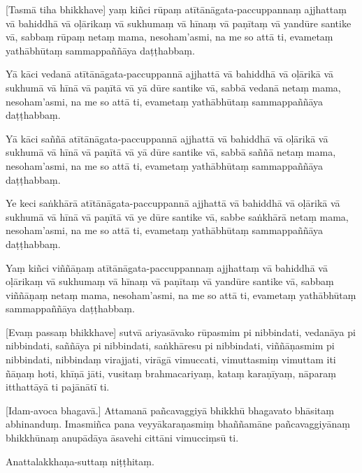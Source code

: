 [Tasmā tiha bhikkhave] yaṃ kiñci rūpaṃ atītānāgata-paccuppannaṃ ajjhattaṃ
vā bahiddhā vā oḷārikaṃ vā sukhumaṃ vā hīnaṃ vā paṇītaṃ vā yandūre
santike vā, sabbaṃ rūpaṃ netaṃ mama, nesoham'asmi, na me so attā ti,
evametaṃ yathābhūtaṃ sammappaññāya daṭṭhabbaṃ.

Yā kāci vedanā atītānāgata-paccuppannā ajjhattā vā bahiddhā vā oḷārikā
vā sukhumā vā hīnā vā paṇītā vā yā dūre santike vā, sabbā vedanā netaṃ
mama, nesoham'asmi, na me so attā ti, evametaṃ yathābhūtaṃ sammappaññāya
daṭṭhabbaṃ.

Yā kāci saññā atītānāgata-paccuppannā ajjhattā vā bahiddhā vā oḷārikā vā
sukhumā vā hīnā vā paṇītā vā yā dūre santike vā, sabbā saññā netaṃ mama,
nesoham'asmi, na me so attā ti, evametaṃ yathābhūtaṃ sammappaññāya
daṭṭhabbaṃ.

Ye keci saṅkhārā atītānāgata-paccuppannā ajjhattā vā bahiddhā vā oḷārikā
vā sukhumā vā hīnā vā paṇītā vā ye dūre santike vā, sabbe saṅkhārā netaṃ
mama, nesoham'asmi, na me so attā ti, evametaṃ yathābhūtaṃ sammappaññāya
daṭṭhabbaṃ.

Yaṃ kiñci viññāṇaṃ atītānāgata-paccuppannaṃ ajjhattaṃ vā bahiddhā vā
oḷārikaṃ vā sukhumaṃ vā hīnaṃ vā paṇītaṃ vā yandūre santike vā, sabbaṃ
viññāṇaṃ netaṃ mama, nesoham'asmi, na me so attā ti, evametaṃ yathābhūtaṃ
sammappaññāya daṭṭhabbaṃ.

\ifhandbookedition
\enlargethispage{\baselineskip}
\fi

[Evaṃ passaṃ bhikkhave] sutvā ariyasāvako rūpasmim pi nibbindati, vedanāya
pi nibbindati, saññāya pi nibbindati, saṅkhāresu pi nibbindati,
viññāṇasmim pi nibbindati, nibbindaṃ virajjati, virāgā vimuccati,
vimuttasmiṃ vimuttam iti ñāṇaṃ hoti, khīṇā jāti, vusitaṃ brahmacariyaṃ,
kataṃ karaṇīyaṃ, nāparaṃ itthattāyā ti pajānātī ti.

[Idam-avoca bhagavā.] Attamanā pañcavaggiyā bhikkhū bhagavato bhāsitaṃ
abhinanduṃ. Imasmiñca pana veyyākaraṇasmiṃ bhaññamāne pañcavaggiyānaṃ
bhikkhūnaṃ anupādāya āsavehi cittāni vimucciṃsū ti.

Anattalakkhaṇa-suttaṃ niṭṭhitaṃ.


